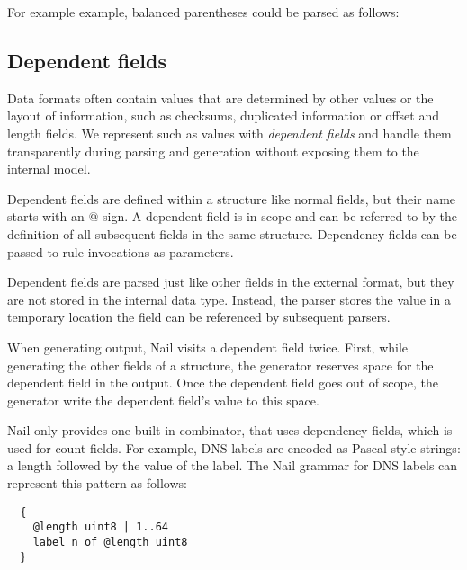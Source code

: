 For example example,   balanced parentheses could be parsed as follows: 




\subsection{Dependent fields}
\label{s:dependent}
Data formats often contain values that are determined by other values or the layout of information,
such as checksums, duplicated information  or offset and  length fields.
We represent such as values with \emph{dependent fields} and handle them transparently during
parsing and generation without exposing them to the internal model. 


Dependent fields are defined within a structure like normal fields, but their name starts with an $@$-sign. 
A dependent field is in scope and can be referred to by the definition of all subsequent fields in
the same structure. Dependency fields can be passed to rule invocations as parameters.

Dependent fields are parsed just like other fields in the external format, but they are not stored
in the internal data type. Instead, the parser stores the value in a
temporary location the field can be referenced by subsequent parsers.

When generating output, Nail visits a dependent field twice. First, while generating the other fields of a
structure, the generator reserves space for the dependent field in the output. Once
the dependent field goes out of scope, the generator  write the
dependent field's value to this space.

Nail only provides one built-in combinator,  that uses dependency fields, which is used
for count fields. For example, DNS labels are encoded as Pascal-style strings: a length followed by
the value of the label. The Nail grammar for DNS labels can represent
this pattern as follows:

{
\smaller[0.5]
\begin{verbatim}
  {
    @length uint8 | 1..64
    label n_of @length uint8
  }
\end{verbatim}
}

